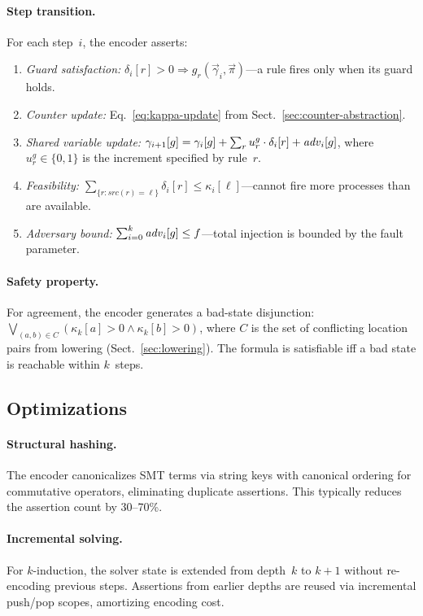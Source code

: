 \paragraph{Step transition.}
For each step~$i$, the encoder asserts:
\begin{enumerate}
  \item \emph{Guard satisfaction:}
    $\delta_i[r] > 0 \Rightarrow g_r(\vec\gamma_i, \vec\pi)$---a rule
    fires only when its guard holds.
  \item \emph{Counter update:}
    Eq.~\eqref{eq:kappa-update} from
    Sect.~\ref{sec:counter-abstraction}.
  \item \emph{Shared variable update:}
    $\gamma_{i+1}[g] = \gamma_i[g] + \sum_r u_r^g \cdot \delta_i[r]
    + \mathit{adv}_i[g]$,
    where $u_r^g \in \{0, 1\}$ is the increment specified by rule~$r$.
  \item \emph{Feasibility:}
    $\sum_{\{r : \mathit{src}(r)=\ell\}} \delta_i[r] \leq
    \kappa_i[\ell]$---cannot fire more processes than are available.
  \item \emph{Adversary bound:}
    $\sum_{i=0}^{k} \mathit{adv}_i[g] \leq f$---total injection is bounded
    by the fault parameter.
\end{enumerate}

\paragraph{Safety property.}
For agreement, the encoder generates a bad-state disjunction:
$\bigvee_{(a,b) \in C} (\kappa_k[a] > 0 \wedge \kappa_k[b] > 0)$,
where $C$ is the set of conflicting location pairs from lowering
(Sect.~\ref{sec:lowering}).  The formula is satisfiable iff a bad
state is reachable within $k$~steps.

\subsection{Optimizations}\label{sec:optimizations}

\paragraph{Structural hashing.}
The encoder canonicalizes SMT terms via string keys with canonical
ordering for commutative operators, eliminating duplicate assertions.
This typically reduces the assertion count by 30--70\%.

\paragraph{Incremental solving.}
For $k$-induction, the solver state is extended from depth~$k$ to
$k{+}1$ without re-encoding previous steps.  Assertions from earlier
depths are reused via incremental push/pop scopes, amortizing encoding
cost.

